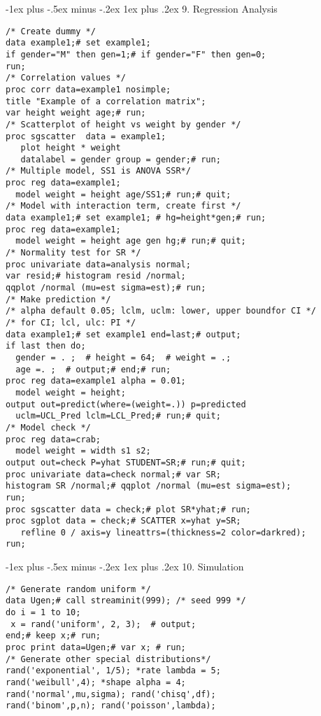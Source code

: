 \documentclass[10pt,landscape,letterpaper]{article}
\makeatletter
\renewcommand{\subsubsection}{\@startsection{subsubsection}{3}{0mm}%
                                {-1ex plus -.5ex minus -.2ex}%
                                {1ex plus .2ex}%
                                {\normalfont\small\itshape}}
\makeatother
\begin{document}
\begin{multicols}{3}
\subsubsection{9. Regression Analysis}
\begin{verbatim}
/* Create dummy */
data example1;# set example1;
if gender="M" then gen=1;# if gender="F" then gen=0;
run;
/* Correlation values */
proc corr data=example1 nosimple; 
title "Example of a correlation matrix";
var height weight age;# run;
/* Scatterplot of height vs weight by gender */
proc sgscatter  data = example1;
   plot height * weight
   datalabel = gender group = gender;# run;
/* Multiple model, SS1 is ANOVA SSR*/
proc reg data=example1;
  model weight = height age/SS1;# run;# quit;
/* Model with interaction term, create first */
data example1;# set example1; # hg=height*gen;# run;
proc reg data=example1;
  model weight = height age gen hg;# run;# quit;
/* Normality test for SR */
proc univariate data=analysis normal;
var resid;# histogram resid /normal;
qqplot /normal (mu=est sigma=est);# run;
/* Make prediction */
/* alpha default 0.05; lclm, uclm: lower, upper boundfor CI */
/* for CI; lcl, ulc: PI */
data example1;# set example1 end=last;# output;
if last then do;
  gender = . ;  # height = 64;  # weight = .;
  age =. ;  # output;# end;# run;
proc reg data=example1 alpha = 0.01;
  model weight = height;
output out=predict(where=(weight=.)) p=predicted 
  uclm=UCL_Pred lclm=LCL_Pred;# run;# quit;
/* Model check */
proc reg data=crab;
  model weight = width s1 s2;
output out=check P=yhat STUDENT=SR;# run;# quit;
proc univariate data=check normal;# var SR;
histogram SR /normal;# qqplot /normal (mu=est sigma=est);
run;
proc sgscatter data = check;# plot SR*yhat;# run;
proc sgplot data = check;# SCATTER x=yhat y=SR;
   refline 0 / axis=y lineattrs=(thickness=2 color=darkred);
run;
\end{verbatim}

\subsubsection{10. Simulation}
\begin{verbatim}
/* Generate random uniform */
data Ugen;# call streaminit(999); /* seed 999 */
do i = 1 to 10;
 x = rand('uniform', 2, 3);  # output;
end;# keep x;# run;
proc print data=Ugen;# var x; # run;
/* Generate other special distributions*/
rand('exponential', 1/5); *rate lambda = 5;
rand('weibull',4); *shape alpha = 4;
rand('normal',mu,sigma); rand('chisq',df);
rand('binom',p,n); rand('poisson',lambda);
\end{verbatim}




\end{multicols}
\end{document}
